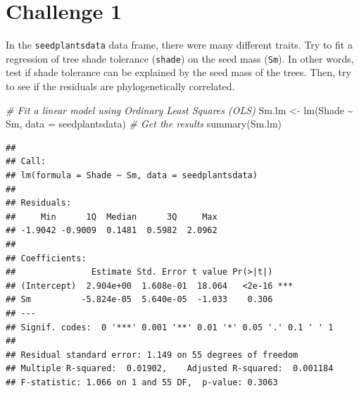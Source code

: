 \documentclass[
]{book}
\newenvironment{Shaded}{\begin{snugshade}}{\end{snugshade}}
\newcommand{\AttributeTok}[1]{\textcolor[rgb]{0.77,0.63,0.00}{#1}}
\newcommand{\CommentTok}[1]{\textcolor[rgb]{0.56,0.35,0.01}{\textit{#1}}}
\newcommand{\FunctionTok}[1]{\textcolor[rgb]{0.00,0.00,0.00}{#1}}
\newcommand{\NormalTok}[1]{#1}
\newcommand{\OtherTok}[1]{\textcolor[rgb]{0.56,0.35,0.01}{#1}}
\newcommand{\SpecialCharTok}[1]{\textcolor[rgb]{0.00,0.00,0.00}{#1}}
\begin{document}
\hypertarget{challenge-1-1}{%
\section{Challenge 1}\label{challenge-1-1}}

In the \texttt{seedplantsdata} data frame, there were many different traits. Try to fit a regression of tree shade tolerance (\texttt{shade}) on the seed mass (\texttt{Sm}). In other words, test if shade tolerance can be explained by the seed mass of the trees. Then, try to see if the residuals are phylogenetically correlated.

\begin{Shaded}
\begin{Highlighting}[]
\CommentTok{\# Fit a linear model using Ordinary Least Squares (OLS)}
\NormalTok{Sm.lm }\OtherTok{\textless{}{-}} \FunctionTok{lm}\NormalTok{(Shade }\SpecialCharTok{\textasciitilde{}}\NormalTok{ Sm, }\AttributeTok{data =}\NormalTok{ seedplantsdata)}
\CommentTok{\# Get the results}
\FunctionTok{summary}\NormalTok{(Sm.lm)}
\end{Highlighting}
\end{Shaded}

\begin{verbatim}
## 
## Call:
## lm(formula = Shade ~ Sm, data = seedplantsdata)
## 
## Residuals:
##     Min      1Q  Median      3Q     Max 
## -1.9042 -0.9009  0.1481  0.5982  2.0962 
## 
## Coefficients:
##               Estimate Std. Error t value Pr(>|t|)    
## (Intercept)  2.904e+00  1.608e-01  18.064   <2e-16 ***
## Sm          -5.824e-05  5.640e-05  -1.033    0.306    
## ---
## Signif. codes:  0 '***' 0.001 '**' 0.01 '*' 0.05 '.' 0.1 ' ' 1
## 
## Residual standard error: 1.149 on 55 degrees of freedom
## Multiple R-squared:  0.01902,    Adjusted R-squared:  0.001184 
## F-statistic: 1.066 on 1 and 55 DF,  p-value: 0.3063
\end{verbatim}
\end{document}
